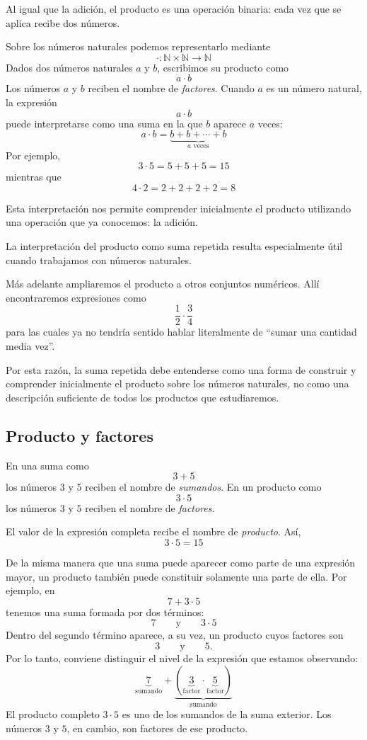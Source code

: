 Al igual que la adición, el producto es una operación binaria: cada vez que se aplica recibe dos números.

Sobre los números naturales podemos representarlo mediante
\[
\cdot\colon\mathbb{N}\times\mathbb{N}\to\mathbb{N}
\]
Dados dos números naturales \(a\) y \(b\), escribimos su producto como
\[
a\cdot b
\]
Los números \(a\) y \(b\) reciben el nombre de \emph{factores}.
Cuando \(a\) es un número natural, la expresión
\[
a\cdot b
\]
puede interpretarse como una suma en la que \(b\) aparece \(a\) veces:
\[
a\cdot b
=
\underbrace{b+b+\cdots+b}_{a\text{ veces}}
\]
Por ejemplo,
\[
3\cdot5
=
5+5+5
=
15
\]
mientras que
\[
4\cdot2
=
2+2+2+2
=
8
\]

Esta interpretación nos permite comprender inicialmente el producto utilizando una operación que ya conocemos: la adición.

\begin{note}
La interpretación del producto como suma repetida resulta especialmente útil cuando trabajamos con números naturales.

Más adelante ampliaremos el producto a otros conjuntos numéricos. Allí encontraremos expresiones como
\[
\frac12\cdot\frac34
\]
para las cuales ya no tendría sentido hablar literalmente de ``sumar una cantidad media vez''.

Por esta razón, la suma repetida debe entenderse como una forma de construir y comprender inicialmente el producto sobre los números naturales, no como una descripción suficiente de todos los productos que estudiaremos.
\end{note}

\subsection{Producto y factores}

En una suma como
\[
3+5
\]
los números \(3\) y \(5\) reciben el nombre de \emph{sumandos}.
En un producto como
\[
3\cdot5
\]
los números \(3\) y \(5\) reciben el nombre de \emph{factores}.

El valor de la expresión completa recibe el nombre de \emph{producto}. Así,
\[
3\cdot5=15
\]

De la misma manera que una suma puede aparecer como parte de una expresión mayor, un producto también puede constituir solamente una parte de ella.
Por ejemplo, en
\[
7+3\cdot5
\]
tenemos una suma formada por dos términos:
\[
7
\qquad\text{y}\qquad
3\cdot5
\]
Dentro del segundo término aparece, a su vez, un producto cuyos factores son
\[
3
\qquad\text{y}\qquad
5.
\]
Por lo tanto, conviene distinguir el nivel de la expresión que estamos observando:
\[
\underbrace{7}_{\text{sumando}}
+
\underbrace{\left(
  \underbrace{3}_{\text{factor}}
  \cdot
  \underbrace{5}_{\text{factor}}
\right)}_{\text{sumando}}
\]
El producto completo \(3\cdot5\) es uno de los sumandos de la suma exterior. Los números \(3\) y \(5\), en cambio, son factores de ese producto.

